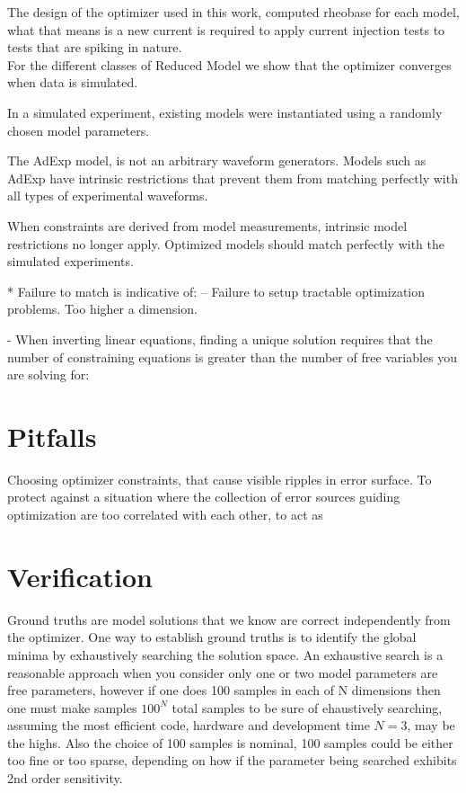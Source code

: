 The design of the optimizer used in this work, computed rheobase for each model, what that means is a new current is required to apply current injection tests to tests that are spiking in nature.\\


For the different classes of Reduced Model we show that the optimizer converges when data is simulated.

In a simulated experiment, existing models were instantiated using a randomly chosen model parameters.

The AdExp model, is not an arbitrary waveform generators. Models such as AdExp have intrinsic restrictions that prevent them from matching perfectly with all types of experimental waveforms.



When constraints are derived from model measurements, intrinsic model restrictions no longer apply. Optimized models should match perfectly with the simulated experiments. 

* Failure to match is indicative of: -- Failure to setup tractable optimization problems. Too higher a dimension.

- When inverting linear equations, finding a unique solution requires that the number of constraining equations is greater than the number of free variables you are solving for:

\section{Pitfalls}
Choosing optimizer constraints, that cause visible ripples in error surface.
To protect against a situation where the collection of error sources guiding optimization are too correlated with each other, to act as 


\section{Verification}
Ground truths are model solutions that we know are correct independently from the optimizer. One way to establish ground truths is to identify the global minima by exhaustively searching the solution space. An exhaustive search is a reasonable approach when you consider only one or two model parameters are free parameters, however if one does 100 samples in each of N dimensions then one must make samples $100^{N}$ total samples to be sure of ehaustively searching, assuming the most efficient code, hardware and development time $N=3$, may be the highs.  Also the choice of 100 samples is nominal, 100 samples could be either too fine or too sparse, depending on how if the parameter being searched exhibits 2nd order sensitivity.

